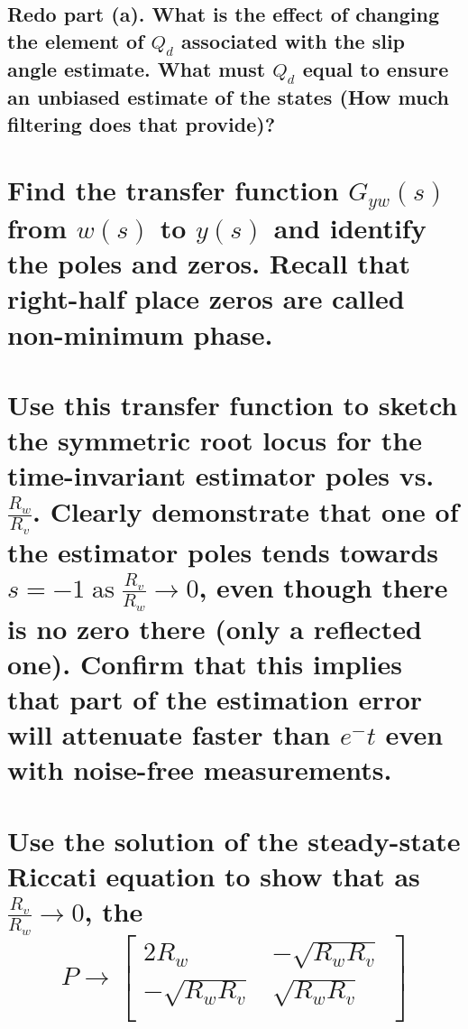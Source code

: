 \documentclass[12pt,letterpaper, onecolumn]{exam}
\begin{document}
\begin{questions}
\begin{parts}
        \part{Redo part (a). What is the effect of changing the element of $Q_d$ associated with the slip angle estimate. What must $Q_d$ equal to ensure an unbiased estimate of the states (How much filtering does that provide)?}

    \end{parts}
    \clearpage
    \begin{parts}
        \part{Find the transfer function $G_{yw}(s)$ from $w(s)$ to $y(s)$ and identify the poles and zeros. Recall that right-half place zeros are called non-minimum phase.}

        \part{Use this transfer function to sketch the symmetric root locus for the time-invariant estimator poles vs. $\frac{R_w}{R_v}$. Clearly demonstrate that one of the estimator poles tends towards $s  = -1\;\text{as}\;\frac{R_v}{R_w} \rightarrow 0$, even though there is no zero there (only a reflected one). Confirm that this implies that part of the estimation error will attenuate faster than $e^-t$ even with noise-free measurements.}

        \part{Use the solution of the steady-state Riccati equation to show that as $\frac{R_v}{R_w} \rightarrow 0$, the
            \begin{equation*}
                P \rightarrow
                \begin{bmatrix}
                    2R_w            & -\sqrt{R_w R_v} \\
                    -\sqrt{R_w R_v} & \sqrt{R_w R_v}  \\
                \end{bmatrix}
            \end{equation*}}


\end{parts}
\end{questions}
\end{document}

